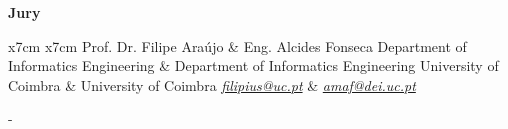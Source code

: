 \begin{center}
 	\vspace{-0.25cm}
 	\Large{\textbf{Jury}}\\[2pc]
 	\begin{table}[h]
 		\begin{center}
 			\setlength{\tabcolsep}{10pt}
 			\begin{tabular}{x{7cm} x{7cm}}
 				\large Prof. Dr. Filipe Araújo & \large Eng. Alcides Fonseca\tabularnewline
 				Department of Informatics Engineering & Department of Informatics Engineering \tabularnewline
 				University of Coimbra & University of Coimbra \tabularnewline
 				\href{mailto:filipius@uc.pt}{\textit{filipius@uc.pt}} & \href{mailto:amaf@dei.uc.pt}{\textit{amaf@dei.uc.pt}}
 			\end{tabular}
 		\end{center}
 	\end{table}
 	
 \end{center}
 
 \vfill
 -